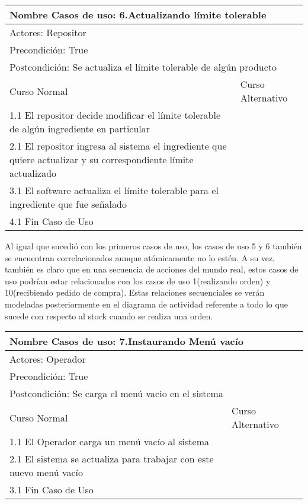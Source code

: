 \documentclass[a4paper,10pt]{article}
\begin{document}
\begin{center}
\begin{tabularx}{14cm}{|X|X|}
\hline
\multicolumn{2}{|l|}{Nombre Casos de uso: 6.Actualizando l\'imite tolerable}\\
\hline
\multicolumn{2}{|l|}{Actores: Repositor}\\
\hline
\multicolumn{2}{|l|}{Precondici\'on: True}\\
\hline
\multicolumn{2}{|l|}{Postcondici\'on: Se actualiza el l\'imite tolerable de alg\'un producto}\\
\hline
Curso Normal & Curso Alternativo\\
\hline
1.1 El repositor decide modificar el l\'imite tolerable de alg\'un ingrediente en particular & 
\\
\hline
2.1 El repositor ingresa al sistema el ingrediente que quiere actualizar y su correspondiente l\'imite actualizado & 
\\
\hline
3.1 El software actualiza el l\'imite tolerable para el ingrediente que fue se\~{n}alado &
\\
\hline
4.1 Fin Caso de Uso &
\\
\hline
\end{tabularx}
\end{center}


\bigskip
Al igual que sucedi\'o con los primeros casos de uso, los casos de uso 5 y 6 tambi\'en se encuentran correlacionados aunque at\'omicamente no lo est\'en.
A su vez, tambi\'en es claro que en una secuencia de acciones del mundo real, estos casos de uso podr\'ian estar relacionados con los casos
de uso 1(realizando orden) y 10(recibiendo pedido de compra). Estas relaciones secuenciales se ver\'an modeladas posteriormente en el diagrama de actividad
referente a todo lo que sucede con respecto al stock cuando se realiza una orden.

\bigskip


\begin{center}
\begin{tabularx}{14cm}{|X|X|}
\hline
\multicolumn{2}{|l|}{Nombre Casos de uso: 7.Instaurando Men\'u vac\'io}\\
\hline
\multicolumn{2}{|l|}{Actores: Operador}\\
\hline
\multicolumn{2}{|l|}{Precondici\'on: True}\\
\hline
\multicolumn{2}{|l|}{Postcondici\'on: Se carga el men\'u vacio en el sistema}\\
\hline
Curso Normal & Curso Alternativo\\
\hline
1.1 El Operador carga un men\'u vac\'io al sistema & 
\\
\hline
2.1 El sistema se actualiza para trabajar con este nuevo men\'u vac\'io & 
\\
\hline
3.1 Fin Caso de Uso &
\\
\hline
\end{tabularx}
\end{center}
\end{document}
